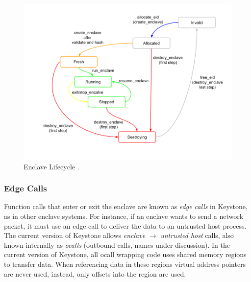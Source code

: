 \begin{figure}[h!]
    \centering
    \includegraphics[scale=0.45]{./chapters/images/Enclave lifecycle.png}
    \caption{Enclave Lifecycle \cite{keystone-doc}.}
    \label{enclave-lifecycle}
\end{figure}

\subsubsection{Edge Calls}
Function calls that enter or exit the enclave are known as \textit{edge calls} in Keystone, as in other enclave systems. For instance, if an enclave wants to send a network packet, it must use an edge call to deliver the data to an untrusted host process. The current version of Keystone allows \textit{enclave} $\rightarrow$ \textit{untrusted host} calls, also known internally as \textit{ocalls} (outbound calls, names under discussion). In the current version of Keystone, all ocall wrapping code uses shared memory regions to transfer data. When referencing data in these regions virtual address pointers are never used, instead, only offsets into the region are used. 



